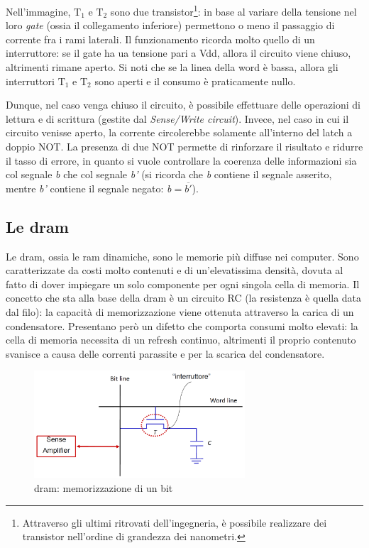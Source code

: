 \documentclass[class=book, crop=false, oneside]{standalone}
\begin{document}
Nell'immagine, \(\textrm{T}_1\) e \(\textrm{T}_2\) sono due transistor\footnote{Attraverso gli ultimi ritrovati dell'ingegneria, è possibile realizzare dei transistor nell'ordine di grandezza dei nanometri.}: in base al variare della tensione nel loro \emph{gate} (ossia il collegamento inferiore) permettono o meno il passaggio di corrente fra i rami laterali. Il funzionamento ricorda molto quello di un interruttore: se il gate ha ua tensione pari a Vdd, allora il circuito viene chiuso, altrimenti rimane aperto. Si noti che se la linea della word è bassa, allora gli interruttori \(\textrm{T}_1\) e \(\textrm{T}_2\) sono aperti e il consumo è praticamente nullo.

Dunque, nel caso venga chiuso il circuito, è possibile effettuare delle operazioni di lettura e di scrittura (gestite dal \emph{Sense/Write circuit}). Invece, nel caso in cui il circuito venisse aperto, la corrente circolerebbe solamente all'interno del latch a doppio NOT. La presenza di due NOT permette di rinforzare il risultato e ridurre il tasso di errore, in quanto si vuole controllare la coerenza delle informazioni sia col segnale \emph{b} che col segnale \emph{b'} (si ricorda che \emph{b} contiene il segnale asserito, mentre \emph{b'} contiene il segnale negato: \emph{b}\(=\)\emph{\(\overline{b'}\)}).

\subsection{Le \acrfull{dram}}
Le \acrshort{dram}, ossia le \acrshort{ram} dinamiche, sono le memorie più diffuse nei computer. Sono caratterizzate da costi molto contenuti e di un'elevatissima densità, dovuta al fatto di dover impiegare un solo componente per ogni singola cella di memoria. Il concetto che sta alla base della \acrshort{dram} è un circuito RC (la resistenza è quella data dal filo): la capacità di memorizzazione viene ottenuta attraverso la carica di un condensatore. Presentano però un difetto che comporta consumi molto elevati: la cella di memoria necessita di un refresh continuo, altrimenti il proprio contenuto svanisce a causa delle correnti parassite e per la scarica del condensatore.

\begin{figure}[H]
	\centering
	\includegraphics[width=0.7\textwidth,keepaspectratio]{cella_DRAM.png}
	\caption{\acrshort{dram}: memorizzazione di un bit}
\end{figure}
\end{document}
